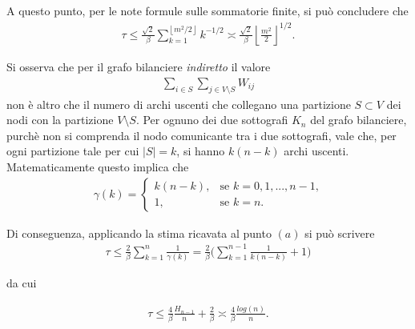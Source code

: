 \begin{alphaparts}
A questo punto, per le note formule sulle sommatorie finite, si può concludere che
\begin{align*}
\tau \leq \frac{\sqrt{2}}{\beta} \sum_{k=1}^{\left \lfloor m^2/2\right \rfloor} k^{-1/2}  \asymp \frac{\sqrt{2}}{\beta} \left\lfloor \frac{m^2}{2}\right \rfloor^{1/2} .
\end{align*}


   \questionpart %
   
Si osserva che per il grafo bilanciere \textit{indiretto} il valore 
\begin{align*}
\sum_{i\in S} \sum_{j\in V\setminus S } W_{ij}
\end{align*}
non è altro che il numero di archi uscenti che collegano una partizione $S \subset V$ dei nodi con la partizione $V\setminus S$.
Per ognuno dei due sottografi $K_n$ del grafo bilanciere, purchè non si comprenda il nodo comunicante tra i due sottografi, vale che, per ogni partizione tale per cui $|S| = k$, si hanno $k(n-k)$ archi uscenti.
Matematicamente questo implica che 
\begin{align*}
\gamma (k) = 
\begin{cases}
k(n-k) , & \text{se $k=0,1,...,n-1$,} \\
1, & \text{se $k=n$.}
\end{cases}
\end{align*}

Di conseguenza, applicando la stima ricavata al punto $(a)$ si può scrivere
\begin{align*}
\tau \le \frac{2}{\beta} \sum_{k = 1}^{n} \frac{1}{\gamma(k)} = \frac{2}{\beta} \bigg( \sum_{k = 1}^{n-1} \frac{1}{k(n-k)} + 1 \bigg)
\end{align*}

da cui 

\begin{align*}
\tau \le \frac{4}{\beta}  \frac{H_{n-1}}{n} + \frac{2}{\beta} \asymp   \frac{4}{\beta}  \frac{log(n)}{n}.\end{align*}










    
\end{alphaparts}